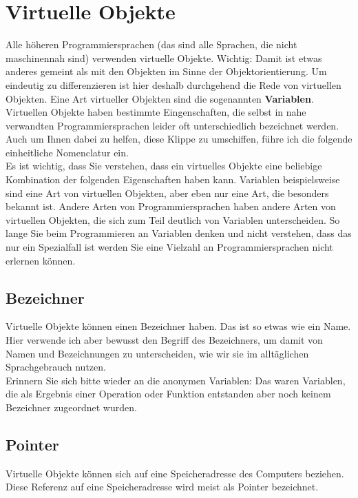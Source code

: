 \section{Virtuelle Objekte}

Alle höheren Programmiersprachen (das sind alle Sprachen, die nicht maschinennah sind) verwenden virtuelle Objekte. Wichtig: Damit ist etwas anderes gemeint als mit den Objekten im Sinne der Objektorientierung. Um eindeutig zu differenzieren ist hier deshalb durchgehend die Rede von \glqq{}virtuellen Objekten\grqq{}. Eine Art virtueller Objekten sind die sogenannten \textbf{Variablen}. Virtuellen Objekte haben bestimmte Eingenschaften, die selbst in nahe verwandten Programmiersprachen leider oft unterschiedlich bezeichnet werden. Auch um Ihnen dabei zu helfen, diese Klippe zu umschiffen, führe ich die folgende einheitliche Nomenclatur ein.\\

Es ist wichtig, dass Sie verstehen, dass ein virtuelles Objekte eine beliebige Kombination der folgenden Eigenschaften haben kann. Variablen beispielsweise sind eine Art von virtuellen Objekten, aber eben nur eine Art, die besonders bekannt ist. Andere Arten von Programmiersprachen haben andere Arten von virtuellen Objekten, die sich zum Teil deutlich von Variablen unterscheiden. So lange Sie beim Programmieren an Variablen denken und nicht verstehen, dass das nur ein Spezialfall ist werden Sie eine Vielzahl an Programmiersprachen nicht erlernen können.

\subsection{Bezeichner}

Virtuelle Objekte können einen Bezeichner haben. Das ist so etwas wie ein Name. Hier verwende ich aber bewusst den Begriff des Bezeichners, um damit von Namen und Bezeichnungen zu unterscheiden, wie wir sie im alltäglichen Sprachgebrauch nutzen.\\

Erinnern Sie sich bitte wieder an die anonymen Variablen: Das waren Variablen, die als Ergebnis einer Operation oder Funktion entstanden aber noch keinem Bezeichner zugeordnet wurden.

\subsection{Pointer}

Virtuelle Objekte können sich auf eine Speicheradresse des Computers beziehen. Diese Referenz auf eine Speicheradresse wird meist als Pointer bezeichnet.\\

